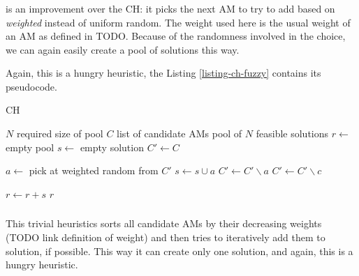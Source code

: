 \subsubsection{}
\label{heu-ch-fuzzy}

 is an improvement over the  CH: it picks the next AM to try to add based on \textit{weighted} instead of uniform random. The weight used here is the usual weight of an AM as defined in TODO. Because of the randomness involved in the choice, we can again easily create a pool of solutions this way.

Again, this is a hungry heuristic, the Listing \ref{listing-ch-fuzzy} contains its pseudocode.


\begin{algorithm}
\caption{ CH}
\label{listing-ch-fuzzy}
\begin{algorithmic}
\REQUIRE $N$ required size of pool
\REQUIRE $C$ list of candidate AMs
\ENSURE pool of $N$ feasible solutions
\STATE $r \gets $ empty pool
  \STATE {}
  \STATE $s \gets $ empty solution
  \STATE $C' \gets C$

    \STATE $a \gets $ pick at weighted random from $C'$
      \STATE $s \gets s \cup a$
      \STATE $C' \gets C' \backslash a$
    \ENDIF
        \STATE {}
        \STATE $C' \gets C' \backslash c$
      \ENDIF
    \ENDFOR
  \ENDWHILE

  \STATE $r \gets r + s$
\ENDFOR
\RETURN $r$
\end{algorithmic}
\end{algorithm}

\subsubsection{}

This trivial heuristics sorts all candidate AMs by their decreasing weights (TODO link definition of weight) and then tries to iteratively add them to solution, if possible. This way it can create only one solution, and again, this is a hungry heuristic.

